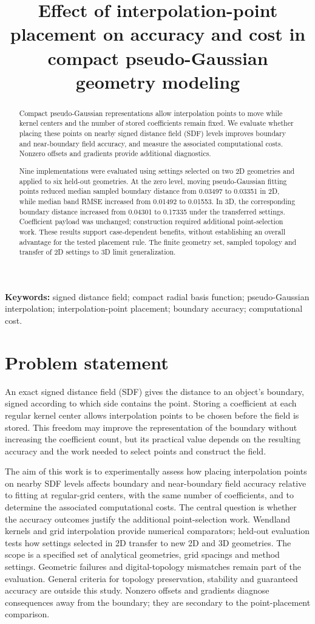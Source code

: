 \documentclass[12pt,letterpaper]{article}
\title{Effect of interpolation-point placement on accuracy and cost in compact pseudo-Gaussian geometry modeling}
\date{}
\begin{document}
\maketitle
\begin{abstract}
  Compact pseudo-Gaussian representations allow interpolation points to move while kernel centers and the number of stored coefficients remain fixed. We evaluate whether placing these points on nearby signed distance field (SDF) levels improves boundary and near-boundary field accuracy, and measure the associated computational costs. Nonzero offsets and gradients provide additional diagnostics.

  Nine implementations were evaluated using settings selected on two 2D geometries and applied to six held-out geometries. At the zero level, moving pseudo-Gaussian fitting points reduced median sampled boundary distance from 0.03497 to 0.03351 in 2D, while median band RMSE increased from 0.01492 to 0.01553. In 3D, the corresponding boundary distance increased from 0.04301 to 0.17335 under the transferred settings. Coefficient payload was unchanged; construction required additional point-selection work. These results support case-dependent benefits, without establishing an overall advantage for the tested placement rule. The finite geometry set, sampled topology and transfer of 2D settings to 3D limit generalization.
\end{abstract}
\noindent\textbf{Keywords:} signed distance field; compact radial basis function; pseudo-Gaussian interpolation; interpolation-point placement; boundary accuracy; computational cost.

\section{Problem statement}
An exact signed distance field (SDF) gives the distance to an object's boundary, signed according to which side contains the point. Storing a coefficient at each regular kernel center allows interpolation points to be chosen before the field is stored. This freedom may improve the representation of the boundary without increasing the coefficient count, but its practical value depends on the resulting accuracy and the work needed to select points and construct the field.

The aim of this work is to experimentally assess how placing interpolation points on nearby SDF levels affects boundary and near-boundary field accuracy relative to fitting at regular-grid centers, with the same number of coefficients, and to determine the associated computational costs. The central question is whether the accuracy outcomes justify the additional point-selection work. Wendland kernels and grid interpolation provide numerical comparators; held-out evaluation tests how settings selected in 2D transfer to new 2D and 3D geometries.
The scope is a specified set of analytical geometries, grid spacings and method settings. Geometric failures and digital-topology mismatches remain part of the evaluation. General criteria for topology preservation, stability and guaranteed accuracy are outside this study. Nonzero offsets and gradients diagnose consequences away from the boundary; they are secondary to the point-placement comparison.
\end{document}

